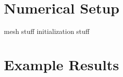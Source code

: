 \documentclass{article}
\begin{document}
\section{Numerical Setup}\label{sec:numsetup}


mesh stuff
initialization stuff

\section{Example Results}\label{sec:results}


\newpage







%
%
%
%
%
%  
%  
%  
%  
% 
\end{document}
